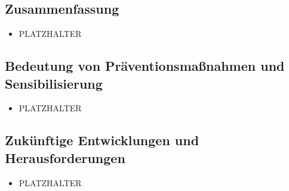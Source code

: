 \documentclass[12pt, a4paper, oneside]{scrartcl}
\begin{document}
\subsection{Zusammenfassung}
\begin{itemize}
  \item PLATZHALTER
\end{itemize}

\subsection{Bedeutung von Präventionsmaßnahmen und Sensibilisierung}
\begin{itemize}
  \item PLATZHALTER
\end{itemize}

\subsection{Zukünftige Entwicklungen und Herausforderungen}
\begin{itemize}
  \item PLATZHALTER
\end{itemize}

\clearpage
\printbibliography[title={Literaturverzeichnis}]
\end{document}
